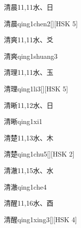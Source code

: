 \begin{entry}{清晨}{11,11}{⽔、⽇}
  \begin{phonetics}{清晨}{qing1chen2}[][HSK 5]
  \end{phonetics}
\end{entry}

\begin{entry}{清爽}{11,11}{⽔、⽘}
  \begin{phonetics}{清爽}{qing1shuang3}
  \end{phonetics}
\end{entry}

\begin{entry}{清理}{11,11}{⽔、⽟}
  \begin{phonetics}{清理}{qing1li3}[][HSK 5]
  \end{phonetics}
\end{entry}

\begin{entry}{清晰}{11,12}{⽔、⽇}
  \begin{phonetics}{清晰}{qing1xi1}
  \end{phonetics}
\end{entry}

\begin{entry}{清楚}{11,13}{⽔、⽊}
  \begin{phonetics}{清楚}{qing1chu5}[][HSK 2]
  \end{phonetics}
\end{entry}

\begin{entry}{清澈}{11,15}{⽔、⽔}
  \begin{phonetics}{清澈}{qing1che4}
  \end{phonetics}
\end{entry}

\begin{entry}{清醒}{11,16}{⽔、⾣}
  \begin{phonetics}{清醒}{qing1xing3}[][HSK 4]
  \end{phonetics}
\end{entry}

